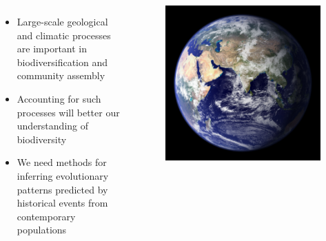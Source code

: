 {
\begin{frame}
    \begin{columns}[c]
        {
        \begin{itemize}
            \item<2-> Large-scale geological and climatic processes are
                important in biodiversification and community assembly
            \item<3-> Accounting for such processes will better our
                understanding of biodiversity
            \item<4-> We need methods for inferring evolutionary patterns
                predicted by historical events from contemporary populations
        \end{itemize}
        }
        \begin{figure}
            \begin{center}
            \includegraphics[width=\textwidth]{../images/earth-image.jpg}
            \end{center}
        \end{figure}
    \end{columns}
\end{frame}
}

